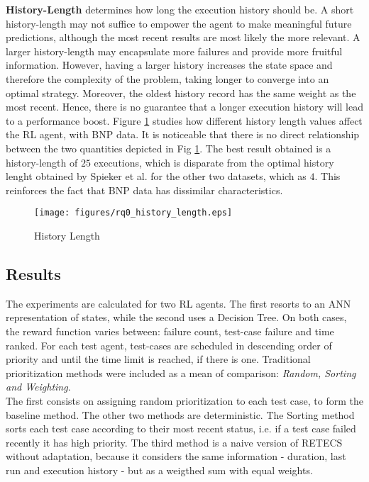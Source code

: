 \textbf{History-Length} determines how long the execution history should be. A short history-length may not suffice to empower the agent to make meaningful future predictions, although the most recent results are most likely the more relevant. A larger history-length may encapsulate more failures and provide more fruitful information. However, having a larger history increases the state space and therefore the complexity of the problem, taking longer to converge into an optimal strategy. Moreover, the oldest history record has the same weight as the most recent. Hence, there is no guarantee that a longer execution history will lead to a performance boost. Figure \ref{hlen} studies how different history length values affect the RL agent, with BNP data. It is noticeable that there is no direct relationship between the two quantities depicted in Fig \ref{hlen}. The best result obtained is a history-length of $25$ executions, which is disparate from the optimal history lenght obtained by Spieker et al. \cite{Spieker} for the other two datasets, which as $4$. This reinforces the fact that BNP data has dissimilar characteristics.

\begin{figure}[htp]
	\centering
	\texttt{[image: figures/rq0\_history\_length.eps]}
	\caption{History Length}
	\label{hlen}
\end{figure}


\subsection{Results} \label{results}

The experiments are calculated for two RL agents. The first resorts to an ANN representation of states, while the second uses a Decision Tree. On both cases, the reward function varies between: failure count, test-case failure and time ranked. For each test agent, test-cases are scheduled in descending order of priority and until the time limit is reached, if there is one.
Traditional prioritization methods were included as a mean of comparison: \textit{Random, Sorting and Weighting}.
\\

 The first consists on assigning random prioritization to each test case, to form the baseline method. The other two methods are deterministic. The Sorting method sorts each test case according to their most recent status, i.e. if a test case failed recently it has high priority. The third method is a naive version of RETECS without adaptation, because it considers the same information - duration, last run and execution history - but as a weigthed sum with equal weights. 
\\


